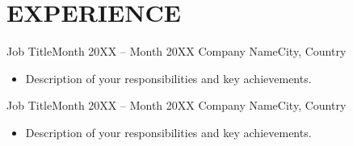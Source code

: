 \section{EXPERIENCE}
\resumeSubHeadingListStart

\resumeSubheading
  {Job Title}{Month 20XX -- Month 20XX}
  {Company Name}{City, Country}
  \begin{itemize}[leftmargin=0.12in, label={}, itemsep=0pt]
    \item \small Description of your responsibilities and key achievements.
  \end{itemize}

\vspace{-4pt}

\resumeSubheading
  {Job Title}{Month 20XX -- Month 20XX}
  {Company Name}{City, Country}
  \begin{itemize}[leftmargin=0.12in, label={}, itemsep=0pt]
    \item \small Description of your responsibilities and key achievements.
  \end{itemize}

\resumeSubHeadingListEnd
